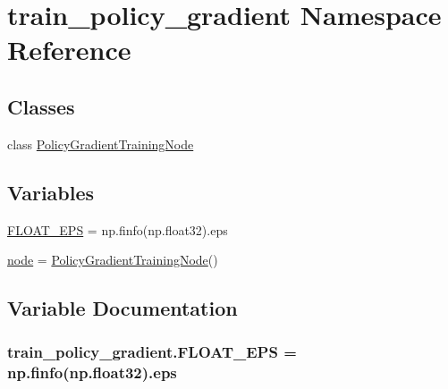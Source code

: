 \hypertarget{namespacetrain__policy__gradient}{}\section{train\+\_\+policy\+\_\+gradient Namespace Reference}
\label{namespacetrain__policy__gradient}
\subsection*{Classes}
\begin{DoxyCompactItemize}
\item 
class \hyperlink{classtrain__policy__gradient_1_1_policy_gradient_training_node}{Policy\+Gradient\+Training\+Node}
\end{DoxyCompactItemize}
\subsection*{Variables}
\begin{DoxyCompactItemize}
\item 
\hyperlink{namespacetrain__policy__gradient_ae010b5b164f6dc67fe1006b7c73b5f74}{F\+L\+O\+A\+T\+\_\+\+E\+PS} = np.\+finfo(np.\+float32).eps
\item 
\hyperlink{namespacetrain__policy__gradient_a852a46833bbfa225d7d5c6ea8430957c}{node} = \hyperlink{classtrain__policy__gradient_1_1_policy_gradient_training_node}{Policy\+Gradient\+Training\+Node}()
\end{DoxyCompactItemize}


\subsection{Variable Documentation}
\subsubsection[{\texorpdfstring{F\+L\+O\+A\+T\+\_\+\+E\+PS}{FLOAT_EPS}}]{\setlength{\rightskip}{0pt plus 5cm}train\+\_\+policy\+\_\+gradient.\+F\+L\+O\+A\+T\+\_\+\+E\+PS = np.\+finfo(np.\+float32).eps}\hypertarget{namespacetrain__policy__gradient_ae010b5b164f6dc67fe1006b7c73b5f74}{}\label{namespacetrain__policy__gradient_ae010b5b164f6dc67fe1006b7c73b5f74}



